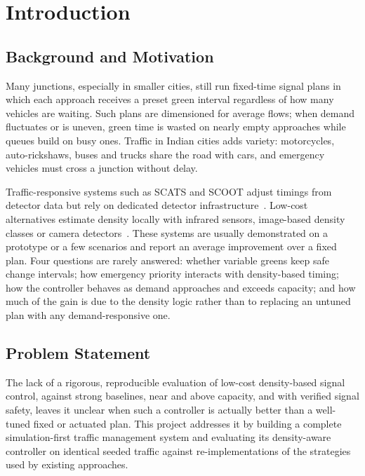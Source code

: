 \chapter{Introduction}
\label{chap:intro}

\section{Background and Motivation}
Many junctions, especially in smaller cities, still run fixed-time signal plans in which each approach receives a preset green interval regardless of how many vehicles are waiting. Such plans are dimensioned for average flows; when demand fluctuates or is uneven, green time is wasted on nearly empty approaches while queues build on busy ones. Traffic in Indian cities adds variety: motorcycles, auto-rickshaws, buses and trucks share the road with cars, and emergency vehicles must cross a junction without delay.

Traffic-responsive systems such as SCATS and SCOOT adjust timings from detector data but rely on dedicated detector infrastructure~\cite{ref3,ref4}. Low-cost alternatives estimate density locally with infrared sensors, image-based density classes or camera detectors~\cite{ref1,ref5,ref6,ref8,ref9,ref10}. These systems are usually demonstrated on a prototype or a few scenarios and report an average improvement over a fixed plan. Four questions are rarely answered: whether variable greens keep safe change intervals; how emergency priority interacts with density-based timing; how the controller behaves as demand approaches and exceeds capacity; and how much of the gain is due to the density logic rather than to replacing an untuned plan with any demand-responsive one.

\section{Problem Statement}
The lack of a rigorous, reproducible evaluation of low-cost density-based signal control, against strong baselines, near and above capacity, and with verified signal safety, leaves it unclear when such a controller is actually better than a well-tuned fixed or actuated plan. This project addresses it by building a complete simulation-first traffic management system and evaluating its density-aware controller on identical seeded traffic against re-implementations of the strategies used by existing approaches.

